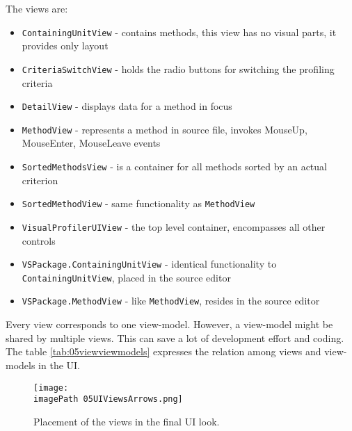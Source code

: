 The views are:
\begin{itemize}	
\item  \texttt{ContainingUnitView} - contains methods, this view has no visual parts, it provides only layout 

\item \texttt{CriteriaSwitchView} - holds the radio buttons for switching the profiling criteria

\item \texttt{DetailView} - displays data for a method in focus

\item \texttt{MethodView} - represents a method in source file, invokes MouseUp, MouseEnter, MouseLeave events

\item \texttt{SortedMethodsView} - is a container for all methods sorted by an actual criterion

\item \texttt{SortedMethodView} - same functionality as \texttt{MethodView}

\item \texttt{VisualProfilerUIView} - the top level container, encompasses all other controls

\item \texttt{VSPackage.ContainingUnitView} - identical functionality to \texttt{ContainingUnitView}, placed in the source editor 

\item \texttt{VSPackage.MethodView} - like \texttt{MethodView}, resides in the source editor

\end{itemize}

Every view corresponds to one view-model. However, a view-model might be shared by multiple views. This can save a lot of development effort and coding. The table \ref{tab:05viewviewmodels} expresses the relation among views and view-models in the UI.

\begin{figure}
	\centering
		\texttt{[image: \\imagePath 05UIViewsArrows.png]}
		\caption{Placement of the views in the final UI look.}
	\label{fig:05UIViewsArrows}
\end{figure}

